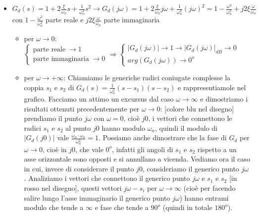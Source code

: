 \begin{itemize}
    \item $G_d(s) = 1 + 2 \frac{\xi}{\omega_n}s + \frac{1}{\omega_n^2}s^2 \rightarrow  G_d(j \omega) = 1 + 2 \frac{\xi}{\omega_n} j \omega + \frac{1}{\omega_n^2}(j \omega)^2 = 1- \frac{\omega^2}{\omega_n^2} + j 2 \xi \frac{\omega}{\omega_n} $ con $1- \frac{\omega^2}{\omega_n^2}$ parte reale e $j 2 \xi \frac{\omega}{\omega_n}$ parte immaginaria
    \begin{itemize}
        \item per $\omega \rightarrow 0$: $\begin{cases}
            \text{parte reale}\; \rightarrow  1\\
            \text{parte immaginaria}\; \rightarrow 0
        \end{cases} \Rightarrow \begin{cases}
            |G_d(j \omega)| \rightarrow 1 \rightarrow |G_d(j \omega)|_{dB} \rightarrow 0\\
            arg(G_d(j \omega)) \rightarrow  0^o
        \end{cases}$ 
        \item per $\omega \rightarrow + \infty$: \newline
        Chiamiamo le generiche radici coniugate complesse  la coppia $s_1$ e $s_2$ di $G_d(s) = \frac{1}{\omega_n^2}(s-s_1)(s-s_2)$ e rappresentiamole nel grafico.\newline \newline
        Facciamo un attimo un excursus dal caso $\omega \rightarrow  \infty$ e dimostriamo i risultati ottenuti precedentemente per $\omega \rightarrow 0$: [colore blu nel disegno] prendiamo il punto $j \omega$ con $\omega=0$, cioè $j0$, i vettori che connettono le radici $s_1$ e $s_2$ al punto $j0$ hanno modulo $\omega_n$, quindi il modulo di $|G_d(j0)|$ vale $\frac{\omega_n \cdot \omega_n}{\omega_n^2} = 1$. Possiamo anche dimostrare che la fase di $G_d$ per $\omega \rightarrow 0$, cioè in $j0$, che vale $0^o$, infatti gli angoli di $s_1$ e $s_2$ rispetto a un asse orizzontale sono opposti e si annullano a vicenda.\newline \newline
        Vediamo ora il caso in cui, invece di considerare il punto $j0$, consideriamo il generico punto $j \omega$. Analiziamo i vettori che connettono il generico punto $j \omega$ e $s_1$ e $s_2$ [in rosso nel disegno], questi vettori $j \omega - s_i$ per $\omega \rightarrow \infty$ (cioè per facendo salire lungo l'asse immaginario il generico punto $j \omega$) hanno entrami modulo che tende a $\infty$ e fase che tende a $90^o$ (quindi in totale $180^o$).\newline

\end{itemize}
\end{itemize}
